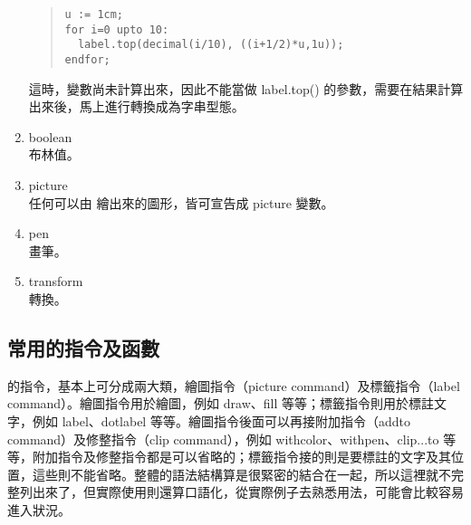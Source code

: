 \begin{enumerate}
        \begin{quote}
          \begin{verbatim}
u := 1cm;
for i=0 upto 10:
  label.top(decimal(i/10), ((i+1/2)*u,1u));
endfor;
\end{verbatim}
        \end{quote}

        這時，變數尚未計算出來，因此不能當做 {\ttfamily label.top()} 的參數，需要在結果計算出來後，馬上進行轉換成為字串型態。

  \item boolean\\
        布林值。
  \item picture\\
        任何可以由 \MP{} 繪出來的圖形，皆可宣告成 picture 變數。
  \item pen\\
        畫筆。
  \item transform\\
        轉換。
\end{enumerate}

\subsection{\MP{} 常用的指令及函數}

\MP{} 的指令，基本上可分成兩大類，繪圖指令（picture command）及標籤指令（label command）。繪圖指令用於繪圖，例如 {\ttfamily draw}、{\ttfamily fill} 等等；標籤指令則用於標註文字，例如 {\ttfamily label}、{\ttfamily dotlabel} 等等。繪圖指令後面可以再接附加指令（addto command）及修整指令（clip command），例如 {\ttfamily withcolor}、{\ttfamily withpen}、{\ttfamily clip...to} 等等，附加指令及修整指令都是可以省略的；標籤指令接的則是要標註的文字及其位置，這些則不能省略。整體的語法結構算是很緊密的結合在一起，所以這裡就不完整列出來了，但實際使用則還算口語化，從實際例子去熟悉用法，可能會比較容易進入狀況。

